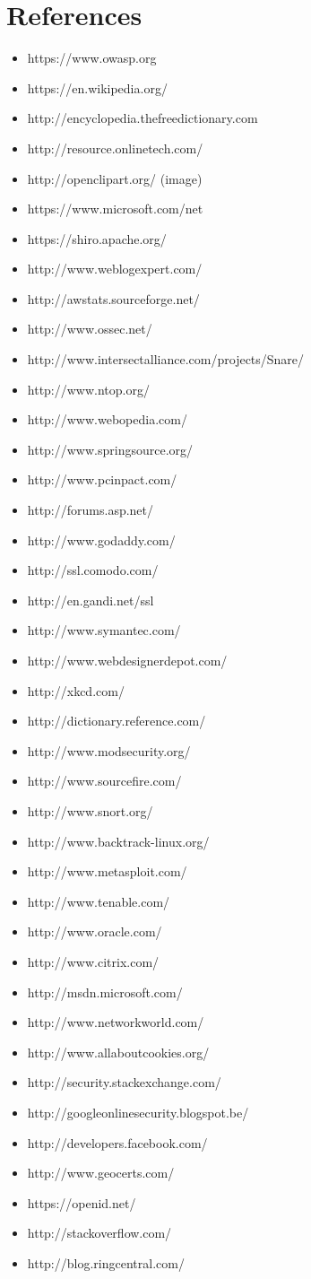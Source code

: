 \section*{References}
\begin{itemize}
\item https://www.owasp.org
\item https://en.wikipedia.org/
\item http://encyclopedia.thefreedictionary.com
\item http://resource.onlinetech.com/
\item http://openclipart.org/ (image)
\item https://www.microsoft.com/net
\item https://shiro.apache.org/
\item http://www.weblogexpert.com/
\item http://awstats.sourceforge.net/
\item http://www.ossec.net/
\item http://www.intersectalliance.com/projects/Snare/
\item http://www.ntop.org/
\item http://www.webopedia.com/
\item http://www.springsource.org/
\item http://www.pcinpact.com/
\item http://forums.asp.net/
\item http://www.godaddy.com/
\item http://ssl.comodo.com/
\item http://en.gandi.net/ssl
\item http://www.symantec.com/
\item http://www.webdesignerdepot.com/
\item http://xkcd.com/
\item http://dictionary.reference.com/
\item http://www.modsecurity.org/
\item http://www.sourcefire.com/
\item http://www.snort.org/
\item http://www.backtrack-linux.org/
\item http://www.metasploit.com/
\item http://www.tenable.com/
\item http://www.oracle.com/
\item http://www.citrix.com/
\item http://msdn.microsoft.com/
\item http://www.networkworld.com/
\item http://www.allaboutcookies.org/
\item http://security.stackexchange.com/
\item http://googleonlinesecurity.blogspot.be/
\item http://developers.facebook.com/
\item http://www.geocerts.com/
\item https://openid.net/
\item http://stackoverflow.com/
\item http://blog.ringcentral.com/
\end{itemize}
